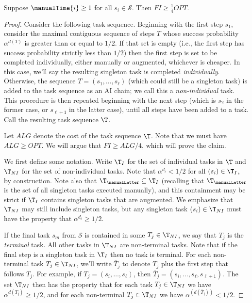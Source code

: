 \begin{lem}
\label{lem:FI.lower.bound.4}
    Suppose $\manualTime{i} \geq 1$ for all $s_i \in \mathcal{S}$.
    Then $FI \geq \tfrac{1}{4}OPT$.
\end{lem}
\begin{proof}

    Consider the following task sequence.
    Beginning with the first step $s_1$, consider the maximal contiguous sequence of steps $T$ whose success probability $\alpha^{d(T)}$ is greater than or equal to $1/2$.
    If that set is empty (i.e., the first step has success probability strictly less than $1/2$) then the first step is set to be completed individually, either manually or augmented, whichever is cheaper.
    In this case, we'll say the resulting singleton task is completed \emph{individually}.
    Otherwise, the sequence $T = (s_1, \dotsc, s_\ell)$ (which could still be a singleton task) is added to the task sequence as an AI chain; we call this a \emph{non-individual} task.
    This procedure is then repeated beginning with the next step (which is $s_2$ in the former case, or $s_{\ell+1}$ in the latter case), until all steps have been added to a task.
    Call the resulting task sequence $\T$.

    \medskip

    Let $ALG$ denote the cost of the task sequence $\T$.
    Note that we must have $ALG \geq OPT$.
    We will argue that $FI \geq ALG/4$, which will prove the claim.

    \medskip

    We first define some notation.
    Write $\T_I$ for the set of individual tasks in $\T$ and $\T_{NI}$ for the set of non-individual tasks.
    Note that $\alpha^{d_i} < 1/2$ for all $(s_i) \in \T_I$, by construction.
    Note also that $\T_{\manualLetter} \subseteq \T_I$ (recalling that $\T_{\manualLetter}$ is the set of all singleton tasks executed manually), and this containment may be strict if $\T_I$ contains singleton tasks that are augmented.
    We emphasize that $\T_{NI}$ may still include singleton tasks, but any singleton task $(s_i) \in \T_{NI}$ must have the property that $\alpha^{d_i} \geq 1/2$.

    If the final task $s_m$ from $\mathcal{S}$ is contained in some $T_j \in \T_{NI}$, we say that $T_j$ is the \emph{terminal} task.
    All other tasks in $\T_{NI}$ are non-terminal tasks.
Note that if the final step is a singleton task in $\T_I$ then no task is terminal.
    For each non-terminal task $T_j \in \T_{NI}$, we'll write $\overline{T}_j$ to denote $T_j$ plus the first step that follows $T_j$.
    For example, if $T_j = (s_i, \dotsc, s_\ell)$, then $\overline{T}_j = (s_i, \dotsc, s_\ell, s_{\ell+1})$.
    The set $\T_{NI}$ then has the property that for each task $T_j \in \T_{NI}$ we have $\alpha^{d(T_j)} \geq 1/2$, and for each non-terminal $T_j \in \T_{NI}$ we have $\alpha^{(d(\overline{T}_j))} < 1/2$.


\end{proof}
